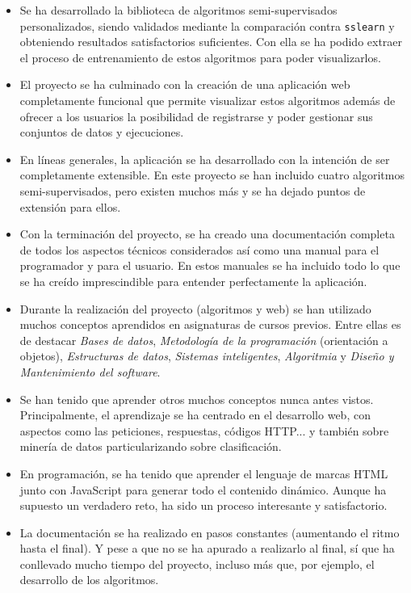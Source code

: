 \begin{itemize}
    \item Se ha desarrollado la biblioteca de algoritmos semi-supervisados
    personalizados, siendo validados mediante la comparación contra
    \texttt{sslearn} y obteniendo resultados satisfactorios suficientes. Con
    ella se ha podido extraer el proceso de entrenamiento de estos algoritmos
    para poder visualizarlos.
    \item El proyecto se ha culminado con la creación de una aplicación web
    completamente funcional que permite visualizar estos algoritmos además de
    ofrecer a los usuarios la posibilidad de registrarse y poder gestionar sus
    conjuntos de datos y ejecuciones.
    \item En líneas generales, la aplicación se ha desarrollado con la intención
    de ser completamente extensible. En este proyecto se han incluido cuatro
    algoritmos semi-supervisados, pero existen muchos más y se ha dejado puntos
    de extensión para ellos.
    \item Con la terminación del proyecto, se ha creado una documentación
    completa de todos los aspectos técnicos considerados así como una manual
    para el programador y para el usuario. En estos manuales se ha incluido todo
    lo que se ha creído imprescindible para entender perfectamente la
    aplicación.
    \item Durante la realización del proyecto (algoritmos y web) se han
    utilizado muchos conceptos aprendidos en asignaturas de cursos previos.
    Entre ellas es de destacar \emph{Bases de datos}, \emph{Metodología de la
    programación} (orientación a objetos), \emph{Estructuras de datos},
    \emph{Sistemas inteligentes}, \emph{Algoritmia} y \emph{Diseño y
    Mantenimiento del software}.
    \item Se han tenido que aprender otros muchos conceptos nunca antes vistos.
    Principalmente, el aprendizaje se ha centrado en el desarrollo web, con
    aspectos como las peticiones, respuestas, códigos HTTP... y también sobre
    minería de datos particularizando sobre clasificación.
    \item En programación, se ha tenido que aprender el lenguaje de marcas HTML junto
    con JavaScript para generar todo el contenido dinámico. Aunque ha supuesto
    un verdadero reto, ha sido un proceso interesante y satisfactorio.
    \item La documentación se ha realizado en pasos constantes (aumentando el
    ritmo hasta el final). Y pese a que no se ha apurado a realizarlo al final,
    sí que ha conllevado mucho tiempo del proyecto, incluso más que, por
    ejemplo, el desarrollo de los algoritmos.
\end{itemize}

